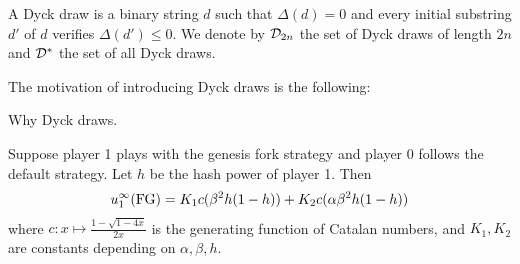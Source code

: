 \begin{mydef}
 A Dyck draw is a binary string $d$ such that $\Delta(d)=0$ and every initial substring $d'$ of $d$ verifies $\Delta(d')\leq 0$. We denote by $\mathcal{D}_{2n}$ the set of Dyck draws of length $2n$ and $\mathcal{D}^\ast$ the set of all Dyck draws.
\end{mydef}


The motivation of introducing Dyck draws is the following:
\begin{mylem}
Why Dyck draws.
\end{mylem}



\begin{myprop*}
	\label{prop-utilityofgenesisinfinite}
	Suppose player 1 plays with the genesis fork strategy and player 0 follows the default strategy. Let $h$ be the hash power of player 1. Then
	\begin{eqnarray*}
		u_1^\infty(\text{\rm FG}) =K_1c(\beta^2h(1-h))+K_2c(\alpha\beta^2h(1-h))
	\end{eqnarray*}
where $c:x\mapsto \frac{1-\sqrt{1-4x}}{2x}$ is the generating function of Catalan numbers, and $K_1,K_2$ are constants depending on $\alpha,\beta,h$.
\end{myprop*}


